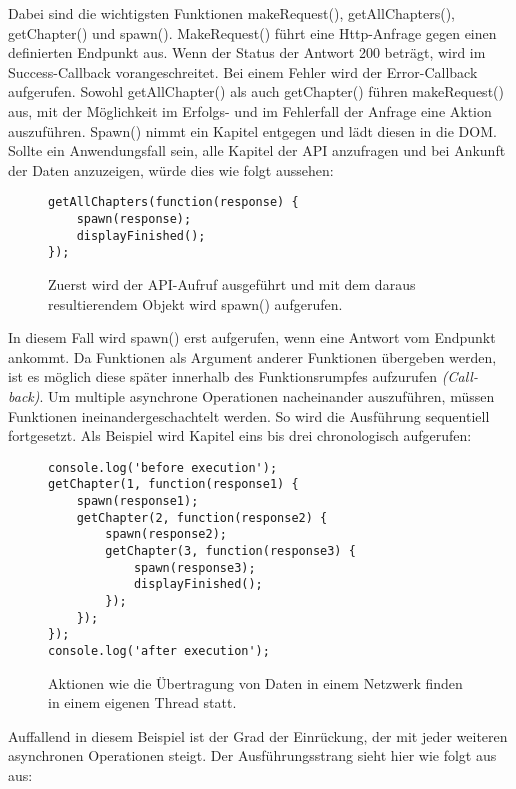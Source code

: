 \noindent
Dabei sind die wichtigsten Funktionen makeRequest(), getAllChapters(), getChapter() und spawn(). MakeRequest() führt eine Http-Anfrage gegen einen definierten Endpunkt aus. Wenn der Status der Antwort 200 beträgt, wird im Success-Callback vorangeschreitet. Bei einem Fehler wird der Error-Callback aufgerufen. Sowohl getAllChapter() als auch getChapter() führen makeRequest() aus, mit der Möglichkeit im Erfolgs- und im Fehlerfall der Anfrage eine Aktion auszuführen. Spawn() nimmt ein Kapitel entgegen und lädt diesen in die DOM. Sollte ein Anwendungsfall sein, alle Kapitel der API anzufragen und bei Ankunft der Daten anzuzeigen, würde dies wie folgt aussehen:

\begin{figure}[H]
\begin{lstlisting}[basicstyle=\small]
getAllChapters(function(response) {
    spawn(response);
    displayFinished();
});
\end{lstlisting}
\caption{Zuerst wird der API-Aufruf ausgeführt und mit dem daraus resultierendem Objekt wird spawn() aufgerufen.}
\end{figure}

\noindent
In diesem Fall wird spawn() erst aufgerufen, wenn eine Antwort vom Endpunkt ankommt. Da Funktionen als Argument anderer Funktionen übergeben werden, ist es möglich diese \glqq{}später\grqq{} innerhalb des Funktionsrumpfes aufzurufen \textit{(\glqq{}Call-back\grqq{})}. Um multiple asynchrone Operationen nacheinander auszuführen, müssen Funktionen ineinandergeschachtelt werden. So wird die Ausführung sequentiell fortgesetzt. Als Beispiel wird Kapitel eins bis drei chronologisch aufgerufen:

\begin{figure}[H]
\begin{lstlisting}[basicstyle=\small]
console.log('before execution');
getChapter(1, function(response1) {
    spawn(response1);
    getChapter(2, function(response2) {
        spawn(response2);
        getChapter(3, function(response3) {
            spawn(response3);
            displayFinished();
        });
    });
});
console.log('after execution');
\end{lstlisting}
\caption{Aktionen wie die Übertragung von Daten in einem Netzwerk finden in einem eigenen Thread statt.}
\end{figure}

\noindent
Auffallend in diesem Beispiel ist der Grad der Einrückung, der mit jeder weiteren asynchronen Operationen steigt. Der Ausführungsstrang sieht hier wie folgt aus aus:

